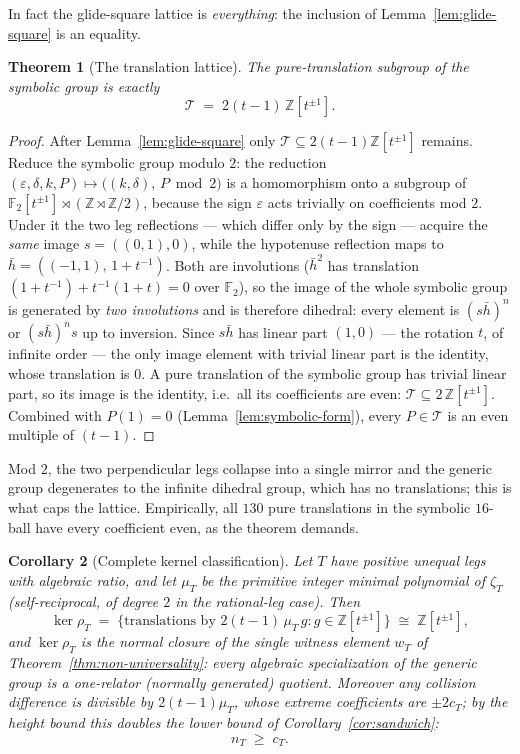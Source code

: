\documentclass[11pt,a4paper]{article}
\newtheorem{theorem}{Theorem}
\newtheorem{corollary}[theorem]{Corollary}
\theoremstyle{remark}
\theoremstyle{plain}
\begin{document}
In fact the glide-square lattice is \emph{everything}: the inclusion
of Lemma~\ref{lem:glide-square} is an equality.

\begin{theorem}[The translation lattice]
\label{thm:translation-lattice}
The pure-translation subgroup of the symbolic group is exactly
\[
\mathcal{T} \;=\; 2(t-1)\,\mathbb{Z}[t^{\pm 1}].
\]
\end{theorem}

\begin{proof}
After Lemma~\ref{lem:glide-square} only
$\mathcal{T} \subseteq 2(t-1)\mathbb{Z}[t^{\pm 1}]$ remains.  Reduce
the symbolic group modulo $2$: the reduction
$(\varepsilon, \delta, k, P) \mapsto \bigl((k, \delta),\, P \bmod
2\bigr)$ is a homomorphism onto a subgroup of
$\mathbb{F}_2[t^{\pm 1}] \rtimes (\mathbb{Z} \rtimes \mathbb{Z}/2)$,
because the sign $\varepsilon$ acts trivially on coefficients mod $2$.
Under it the two leg reflections --- which differ only by the sign ---
acquire the \emph{same} image $s = ((0,1), 0)$, while the hypotenuse
reflection maps to $\bar h = ((-1,1),\, 1 + t^{-1})$.  Both are
involutions ($\bar h^2$ has translation
$(1+t^{-1}) + t^{-1}(1+t) = 0$ over $\mathbb{F}_2$), so the image of
the whole symbolic group is generated by \emph{two involutions} and is
therefore dihedral: every element is $(s\bar h)^n$ or
$(s\bar h)^n s$ up to inversion.  Since $s \bar h$ has linear part
$(1, 0)$ --- the rotation $t$, of infinite order --- the only image
element with trivial linear part is the identity, whose translation is
$0$.  A pure translation of the symbolic group has trivial linear part,
so its image is the identity, i.e.\ all its coefficients are even:
$\mathcal{T} \subseteq 2\,\mathbb{Z}[t^{\pm 1}]$.  Combined with
$P(1) = 0$ (Lemma~\ref{lem:symbolic-form}), every $P \in \mathcal{T}$
is an even multiple of $(t-1)$.
\end{proof}

Mod $2$, the two perpendicular legs collapse into a single mirror and
the generic group degenerates to the infinite dihedral group, which has
no translations; this is what caps the lattice.  Empirically, all $130$
pure translations in the symbolic $16$-ball have every coefficient
even, as the theorem demands.

\begin{corollary}[Complete kernel classification]
\label{cor:kernel-classification}
Let $T$ have positive unequal legs with algebraic ratio, and let
$\mu_T$ be the primitive integer minimal polynomial of $\zeta_T$
(self-reciprocal, of degree $2$ in the rational-leg case).  Then
\[
\ker \rho_T \;=\; \bigl\{\text{translations by } 2(t-1)\,\mu_T\, g
: g \in \mathbb{Z}[t^{\pm 1}]\bigr\}
\;\cong\; \mathbb{Z}[t^{\pm 1}],
\]
and $\ker \rho_T$ is the normal closure of the \emph{single} witness
element $w_T$ of Theorem~\ref{thm:non-universality}: every algebraic
specialization of the generic group is a one-relator (normally
generated) quotient.  Moreover any collision difference is divisible by
$2(t-1)\mu_T$, whose extreme coefficients are $\pm 2c_T$; by the
height bound this \emph{doubles} the lower bound of
Corollary~\ref{cor:sandwich}:
\[
n_T \;\ge\; c_T .
\]
\end{corollary}
\end{document}
